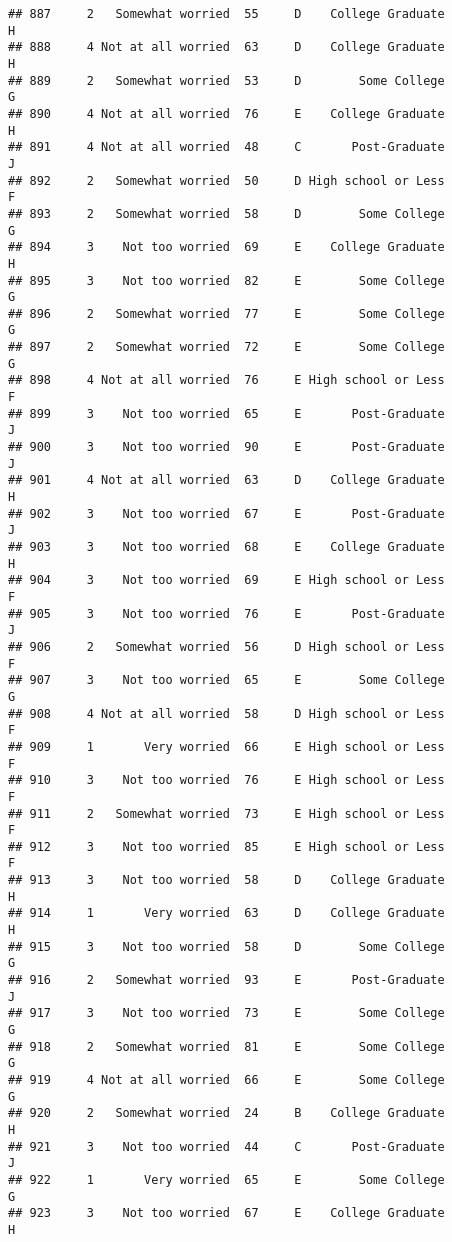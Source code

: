 \documentclass[
]{article}
\begin{document}
\begin{verbatim}
## 887     2   Somewhat worried  55     D    College Graduate         H
## 888     4 Not at all worried  63     D    College Graduate         H
## 889     2   Somewhat worried  53     D        Some College         G
## 890     4 Not at all worried  76     E    College Graduate         H
## 891     4 Not at all worried  48     C       Post-Graduate         J
## 892     2   Somewhat worried  50     D High school or Less         F
## 893     2   Somewhat worried  58     D        Some College         G
## 894     3    Not too worried  69     E    College Graduate         H
## 895     3    Not too worried  82     E        Some College         G
## 896     2   Somewhat worried  77     E        Some College         G
## 897     2   Somewhat worried  72     E        Some College         G
## 898     4 Not at all worried  76     E High school or Less         F
## 899     3    Not too worried  65     E       Post-Graduate         J
## 900     3    Not too worried  90     E       Post-Graduate         J
## 901     4 Not at all worried  63     D    College Graduate         H
## 902     3    Not too worried  67     E       Post-Graduate         J
## 903     3    Not too worried  68     E    College Graduate         H
## 904     3    Not too worried  69     E High school or Less         F
## 905     3    Not too worried  76     E       Post-Graduate         J
## 906     2   Somewhat worried  56     D High school or Less         F
## 907     3    Not too worried  65     E        Some College         G
## 908     4 Not at all worried  58     D High school or Less         F
## 909     1       Very worried  66     E High school or Less         F
## 910     3    Not too worried  76     E High school or Less         F
## 911     2   Somewhat worried  73     E High school or Less         F
## 912     3    Not too worried  85     E High school or Less         F
## 913     3    Not too worried  58     D    College Graduate         H
## 914     1       Very worried  63     D    College Graduate         H
## 915     3    Not too worried  58     D        Some College         G
## 916     2   Somewhat worried  93     E       Post-Graduate         J
## 917     3    Not too worried  73     E        Some College         G
## 918     2   Somewhat worried  81     E        Some College         G
## 919     4 Not at all worried  66     E        Some College         G
## 920     2   Somewhat worried  24     B    College Graduate         H
## 921     3    Not too worried  44     C       Post-Graduate         J
## 922     1       Very worried  65     E        Some College         G
## 923     3    Not too worried  67     E    College Graduate         H

\end{verbatim}
\end{document}
